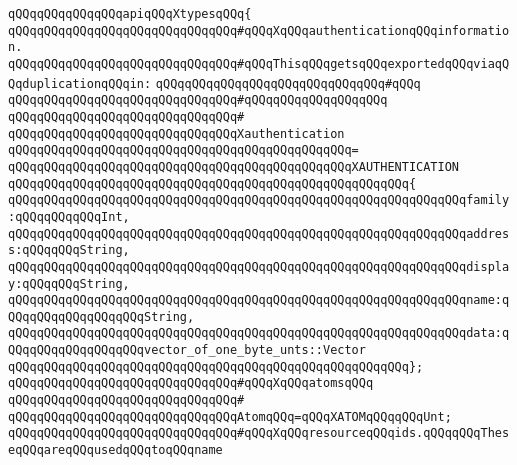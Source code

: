 \verb|qQQqqQQqqQQqqQQqapiqQQqXtypesqQQq{|\newline
\newline
\verb|qQQqqQQqqQQqqQQqqQQqqQQqqQQqqQQq#qQQqXqQQqauthenticationqQQqinformation.|\newline
\verb|qQQqqQQqqQQqqQQqqQQqqQQqqQQqqQQq#qQQqThisqQQqgetsqQQqexportedqQQqviaqQQqduplicationqQQqin:|\newline
\verb|qQQqqQQqqQQqqQQqqQQqqQQqqQQqqQQq#qQQq|\newline
\verb|qQQqqQQqqQQqqQQqqQQqqQQqqQQqqQQq#qQQqqQQqqQQqqQQqqQQq|\newline
\verb|qQQqqQQqqQQqqQQqqQQqqQQqqQQqqQQq#|\newline
\verb|qQQqqQQqqQQqqQQqqQQqqQQqqQQqqQQqXauthentication|\newline
\verb|qQQqqQQqqQQqqQQqqQQqqQQqqQQqqQQqqQQqqQQqqQQqqQQq=|\newline
\verb|qQQqqQQqqQQqqQQqqQQqqQQqqQQqqQQqqQQqqQQqqQQqqQQqXAUTHENTICATION|\newline
\verb|qQQqqQQqqQQqqQQqqQQqqQQqqQQqqQQqqQQqqQQqqQQqqQQqqQQqqQQq{|\newline
\verb|qQQqqQQqqQQqqQQqqQQqqQQqqQQqqQQqqQQqqQQqqQQqqQQqqQQqqQQqqQQqqQQqfamily:qQQqqQQqqQQqInt,|\newline
\verb|qQQqqQQqqQQqqQQqqQQqqQQqqQQqqQQqqQQqqQQqqQQqqQQqqQQqqQQqqQQqqQQqaddress:qQQqqQQqString,|\newline
\verb|qQQqqQQqqQQqqQQqqQQqqQQqqQQqqQQqqQQqqQQqqQQqqQQqqQQqqQQqqQQqqQQqdisplay:qQQqqQQqString,|\newline
\verb|qQQqqQQqqQQqqQQqqQQqqQQqqQQqqQQqqQQqqQQqqQQqqQQqqQQqqQQqqQQqqQQqname:qQQqqQQqqQQqqQQqqQQqString,|\newline
\verb|qQQqqQQqqQQqqQQqqQQqqQQqqQQqqQQqqQQqqQQqqQQqqQQqqQQqqQQqqQQqqQQqdata:qQQqqQQqqQQqqQQqqQQqvector_of_one_byte_unts::Vector|\newline
\verb|qQQqqQQqqQQqqQQqqQQqqQQqqQQqqQQqqQQqqQQqqQQqqQQqqQQqqQQq};|\newline
\newline
\verb|qQQqqQQqqQQqqQQqqQQqqQQqqQQqqQQq#qQQqXqQQqatomsqQQq|\newline
\verb|qQQqqQQqqQQqqQQqqQQqqQQqqQQqqQQq#|\newline
\verb|qQQqqQQqqQQqqQQqqQQqqQQqqQQqqQQqAtomqQQq=qQQqXATOMqQQqqQQqUnt;|\newline
\newline
\verb|qQQqqQQqqQQqqQQqqQQqqQQqqQQqqQQq#qQQqXqQQqresourceqQQqids.qQQqqQQqTheseqQQqareqQQqusedqQQqtoqQQqname|\newline
